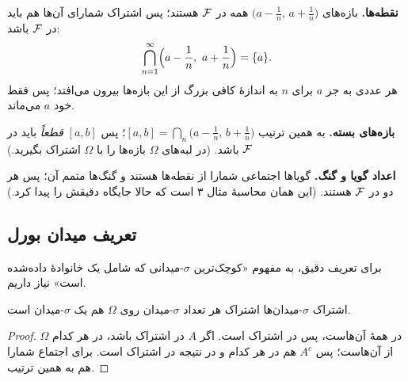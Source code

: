\textbf{نقطه‌ها.} بازه‌های $\bigl(a-\tfrac1n,\,a+\tfrac1n\bigr)$ همه در $\mathcal{F}$ هستند؛ پس اشتراک شمارای آن‌ها هم باید در $\mathcal{F}$ باشد:
\[ \bigcap_{n=1}^\infty\Bigl(a-\frac1n,\ a+\frac1n\Bigr)=\{a\}. \]
هر عددی به جز $a$ برای $n$ به اندازهٔ کافی بزرگ از این بازه‌ها بیرون می‌افتد؛ پس فقط خود $a$ می‌ماند.

\begin{figblock}

\end{figblock}

\textbf{بازه‌های بسته.} به همین ترتیب $[a,b]=\bigcap_n\bigl(a-\tfrac1n,\,b+\tfrac1n\bigr)$؛ پس $[a,b]$ \emph{قطعاً} باید در $\mathcal{F}$ باشد. (در لبه‌های $\Omega$ بازه‌ها را با $\Omega$ اشتراک بگیرید.)

\textbf{اعداد گویا و گنگ.} گویاها اجتماعی شمارا از نقطه‌ها هستند و گنگ‌ها متمم آن؛ پس هر دو در $\mathcal{F}$ هستند. (این همان محاسبهٔ مثال ۳ است که حالا جایگاه دقیقش را پیدا کرد.)

\subsection{تعریف میدان بورل}

برای تعریف دقیق، به مفهوم «کوچک‌ترین $\sigma$-میدانی که شامل یک خانوادهٔ داده‌شده است» نیاز داریم.

\begin{lemma}[label=lem:intersection]{اشتراک $\sigma$-میدان‌ها}
اشتراک هر تعداد $\sigma$-میدان روی $\Omega$ هم یک $\sigma$-میدان است.
\end{lemma}

\begin{proof}
$\Omega$ در همهٔ آن‌هاست، پس در اشتراک است. اگر $A$ در اشتراک باشد، در هر کدام از آن‌هاست؛ پس $A^c$ هم در هر کدام و در نتیجه در اشتراک است. برای اجتماع شمارا هم به همین ترتیب.
\end{proof}

